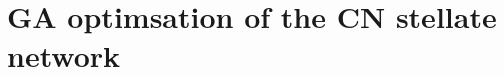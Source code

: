 \documentclass[11pt,a4paper,twoside,openright]{book}
\begin{document}

		{%
			\singlespacing%
                        \listoftodos
			\tableofcontents%
                        \printglossary
		   \clearpage%
		}%


\setcounter{chapter}{4}
\chapter[GAChapter]{GA optimsation of the CN stellate network}
\label{sec:GAChapter}





\newpage

\newpage

\newpage

\newpage




\appendix


 
\end{document}
